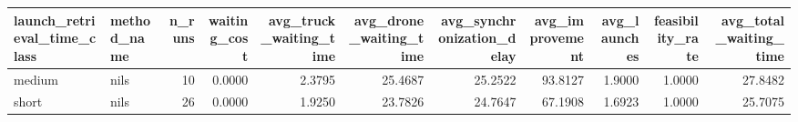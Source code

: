 \begin{tabular}{llrrrrrrrrr}
\toprule
launch_retrieval_time_class & method_name & n_runs & waiting_cost & avg_truck_waiting_time & avg_drone_waiting_time & avg_synchronization_delay & avg_improvement & avg_launches & feasibility_rate & avg_total_waiting_time \\
\midrule
medium & nils & 10 & 0.0000 & 2.3795 & 25.4687 & 25.2522 & 93.8127 & 1.9000 & 1.0000 & 27.8482 \\
short & nils & 26 & 0.0000 & 1.9250 & 23.7826 & 24.7647 & 67.1908 & 1.6923 & 1.0000 & 25.7075 \\
\bottomrule
\end{tabular}
